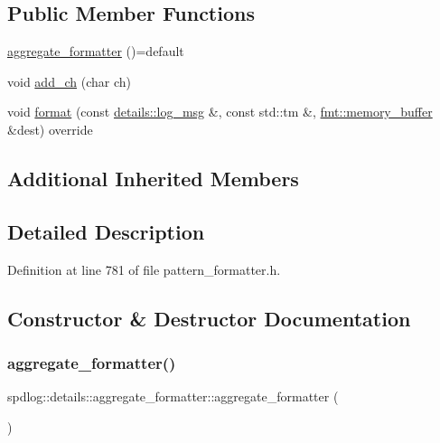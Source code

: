 \subsection*{Public Member Functions}
\begin{DoxyCompactItemize}
\item 
\hyperlink{classspdlog_1_1details_1_1aggregate__formatter_a068c157540411ecb4932860266effb82}{aggregate\+\_\+formatter} ()=default
\item 
void \hyperlink{classspdlog_1_1details_1_1aggregate__formatter_aa4a450cafac2ed6ef1fdc6dbda962ac6}{add\+\_\+ch} (char ch)
\item 
void \hyperlink{classspdlog_1_1details_1_1aggregate__formatter_a19bcf6f721f9a3b2758a59293305987d}{format} (const \hyperlink{structspdlog_1_1details_1_1log__msg}{details\+::log\+\_\+msg} \&, const std\+::tm \&, \hyperlink{format_8h_a21cbf729f69302f578e6db21c5e9e0d2}{fmt\+::memory\+\_\+buffer} \&dest) override
\end{DoxyCompactItemize}
\subsection*{Additional Inherited Members}


\subsection{Detailed Description}


Definition at line 781 of file pattern\+\_\+formatter.\+h.



\subsection{Constructor \& Destructor Documentation}
\mbox{\label{classspdlog_1_1details_1_1aggregate__formatter_a068c157540411ecb4932860266effb82}} 
\subsubsection{\texorpdfstring{aggregate\+\_\+formatter()}{aggregate\_formatter()}}
{\footnotesize\ttfamily spdlog\+::details\+::aggregate\+\_\+formatter\+::aggregate\+\_\+formatter (\begin{DoxyParamCaption}{ }\end{DoxyParamCaption})\hspace{0.3cm}{\ttfamily [default]}}



